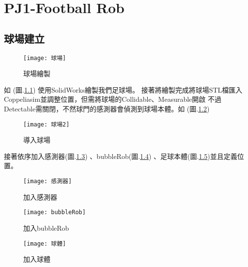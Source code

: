 \chapter{PJ1-Football Rob}
\section{球場建立}
\begin{figure}[hbt!]
\begin{center}
\texttt{[image: 球場]}
\caption{\Large 球場繪製}\label{球場繪製}
\end{center}
\end{figure} 
如 (圖.\ref{球場繪製}) 使用SolidWorks繪製我們足球場。
接著將繪製完成將球場STL檔匯入Coppeliasim並調整位置，但需將球場的Collidable、Measurable開啟
不過Detectable需關閉，不然球門的感測器會偵測到球場本體。如 (圖.\ref{導入球場}) 
\begin{figure}[hbt!]
\begin{center}
\texttt{[image: 球場2]}
\caption{\Large 導入球場}\label{導入球場}
\end{center}
\end{figure} 
\newpage

接著依序加入感測器(圖.\ref{加入感測器}) 、bubbleRob(圖.\ref{加入bubbleRob}) 、足球本體(圖.\ref{加入球體})並且定義位置。
\begin{figure}[hbt!]
\begin{center}
\texttt{[image: 感測器]}
\caption{\Large 加入感測器}\label{加入感測器}
\end{center}
\end{figure} 
\begin{figure}[hbt!]
\begin{center}
\texttt{[image: bubbleRob]}
\caption{\Large 加入bubbleRob}\label{加入bubbleRob}
\end{center}
\end{figure} 
\begin{figure}[hbt!]
\begin{center}
\texttt{[image: 球體]}
\caption{\Large 加入球體}\label{加入球體}
\end{center}
\end{figure} 
\newpage